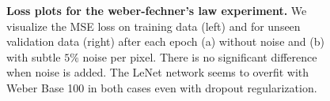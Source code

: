 \documentclass[journal]{vgtc}                %
\begin{document}
\begin{figure}[t]
	\centering
	
	\hfill

  \caption{\textbf{Loss plots for the weber-fechner's law experiment.} We visualize the MSE loss on training data (left) and for unseen validation data (right) after each epoch (a) without noise and (b) with subtle $5\%$ noise per pixel. There is no significant difference when noise is added. The LeNet network seems to overfit with Weber Base 100 in both cases even with dropout regularization.}
	\label{fig:weber_loss}
\end{figure}


%
%
%
%
%

%
\end{document}
